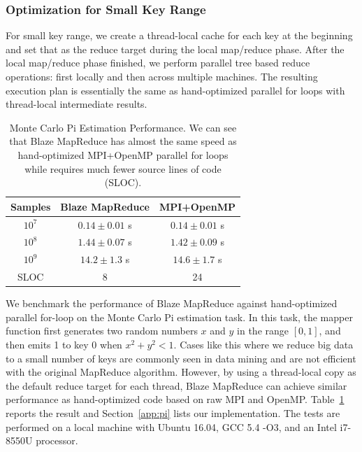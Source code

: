 \subsubsection{Optimization for Small Key Range}

For small key range, we create a thread-local cache for each key at the beginning and set that as the reduce target during the local map/reduce phase.
After the local map/reduce phase finished, we perform parallel tree based reduce operations: first locally and then across multiple machines.
The resulting execution plan is essentially the same as hand-optimized parallel for loops with thread-local intermediate results.

\begin{table}
  \caption{Monte Carlo Pi Estimation Performance.
  We can see that Blaze MapReduce has almost the same speed as hand-optimized MPI+OpenMP parallel for loops while requires much fewer source lines of code (SLOC).}
  \label{tab:pi}
  \begin{center}
  \begin{tabular}{ccc}
    \hline
    Samples & Blaze MapReduce & MPI+OpenMP\\
    \hline
    $10^7$ & $0.14\pm 0.01$ s& $0.14\pm 0.01$ s \\
    $10^8$ & $1.44\pm 0.07$ s& $1.42\pm 0.09$ s \\
    $10^9$ & $14.2\pm 1.3$ s& $14.6\pm 1.7$ s \\
    \hline
    SLOC & 8 & 24 \\
    \hline
  \end{tabular}
  \end{center}
\end{table}

We benchmark the performance of Blaze MapReduce against hand-optimized parallel for-loop on the Monte Carlo Pi estimation task.
In this task, the mapper function first generates two random numbers $x$ and $y$ in the range $[0, 1]$, and then emits 1 to key 0 when $x^2 + y^2 < 1$.
Cases like this where we reduce big data to a small number of keys are commonly seen in data mining and are not efficient with the original MapReduce algorithm.
However, by using a thread-local copy as the default reduce target for each thread, Blaze MapReduce can achieve similar performance as hand-optimized code based on raw MPI and OpenMP.
Table~\ref{tab:pi} reports the result and Section~\ref{app:pi} lists our implementation.
The tests are performed on a local machine with Ubuntu 16.04, GCC 5.4 -O3, and an Intel i7-8550U processor.

